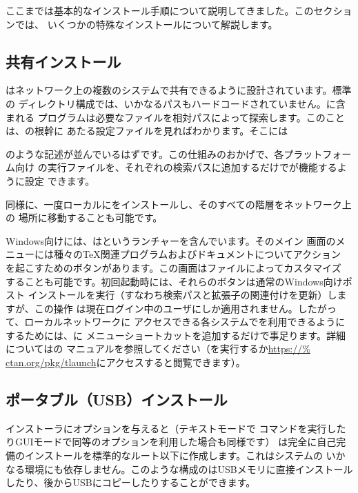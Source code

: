 \documentclass[uplatex,dvipdfmx]{jsarticle}
\begin{document}
ここまでは基本的なインストール手順について説明してきました。このセクションでは、
いくつかの特殊なインストールについて解説します。

\subsection{共有インストール}
\label{sec:sharedinstall}

\TL はネットワーク上の複数のシステムで共有できるように設計されています。標準の
ディレクトリ構成では、いかなるパスもハードコードされていません。\TL に含まれる
プログラムは必要なファイルを相対パスによって探索します。このことは、\TL の根幹に
あたる設定ファイルを見ればわかります。そこには
%
%
のような記述が並んでいるはずです。この仕組みのおかげで、各プラットフォーム向け
の実行ファイルを、それぞれの検索パスに追加するだけで\TL が機能するように設定
できます。

同様に、一度ローカルに\TL をインストールし、そのすべての階層をネットワーク上の
場所に移動することも可能です。

Windows向けには、\TL はというランチャーを含んでいます。そのメイン
画面のメニューには種々の\TeX 関連プログラムおよびドキュメントについてアクション
を起こすためのボタンがあります。この画面はファイルによってカスタマイズ
することも可能です。初回起動時には、それらのボタンは通常のWindows向けポスト
インストールを実行（すなわち検索パスと拡張子の関連付けを更新）しますが、この操作
は現在ログイン中のユーザにしか適用されません。したがって、ローカルネットワークに
アクセスできる各システムで\TL を利用できるようにするためには、に
メニューショートカットを追加するだけで事足ります。詳細についてはの
マニュアルを参照してください（を実行するか\url{https://%
ctan.org/pkg/tlaunch}にアクセスすると閲覧できます）。

\subsection{ポータブル（USB）インストール}
\label{sec:portable-tl}

\TL インストーラにオプションを与えると（テキストモードで%
コマンドを実行したりGUIモードで同等のオプションを利用した場合も同様です）\TL
は完全に自己完備のインストールを標準的なルート以下に作成します。これはシステムの
いかなる環境にも依存しません。このような構成の\TL はUSBメモリに直接インストール
したり、後からUSBにコピーしたりすることができます。
\end{document}
